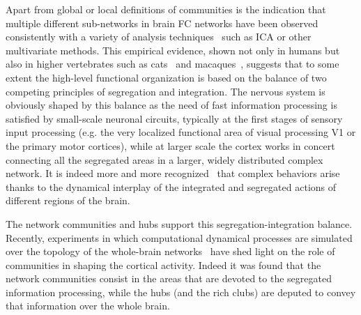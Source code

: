 Apart from global or local definitions of communities is the indication that multiple different sub-networks in brain FC networks have been observed consistently with a variety of analysis techniques~\cite{fox2005,deluca2006,schwarz2007} such as ICA or other multivariate methods.
This empirical evidence, shown not only in humans but also in higher vertebrates such as cats~\cite{scannell1995} and macaques~\cite{felleman1991}, suggests that to some extent the high-level functional organization is based on the balance of two competing principles of segregation and integration.
The nervous system is obviously shaped by this balance as the need of fast information processing is satisfied by small-scale neuronal circuits, typically at the first stages of sensory input processing (e.g. the very localized functional area of visual processing V1 or the primary motor cortices), while at larger scale the cortex works in concert connecting all the segregated areas in a larger, widely distributed complex network.
It is indeed more and more recognized~\cite{tononi1994,tononi1998,deco2015} that complex behaviors arise thanks to the dynamical interplay of the integrated and segregated actions of different regions of the brain.

The network communities and hubs support this segregation-integration balance. Recently, experiments in which computational dynamical processes are simulated over the topology of the whole-brain networks~\cite{deco2015} have shed light on the role of communities in shaping the cortical activity. Indeed it was found that the network communities consist in the areas that are devoted to the segregated information processing, while the hubs (and the rich clubs) are deputed to convey that information over the whole brain.



